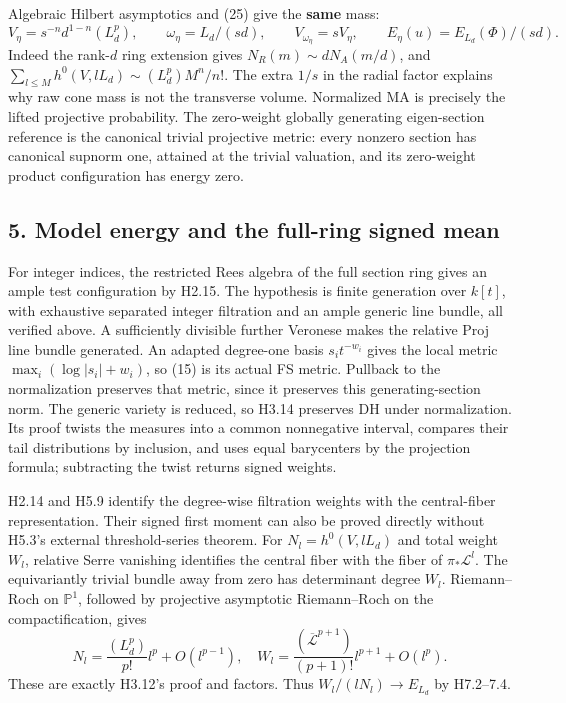 \documentclass[
  10pt,
]{article}
\begin{document}
Algebraic Hilbert asymptotics and (25) give the \textbf{same} mass:
\[ V_\eta=s^{-n}d^{1-n}(L_d^p),\qquad\omega_\eta=L_d/(sd),\qquad V_{\omega_\eta}=sV_\eta,\qquad
 E_\eta(u)=E_{L_d}(\Phi)/(sd).                                                               \tag{26}\]
Indeed the rank-\(d\) ring extension gives \(N_R(m)\sim dN_A(m/d)\), and
\(\sum_{l\leq M}h^0(V,lL_d)\sim(L_d^p)M^n/n!\). The extra \(1/s\) in the
radial factor explains why raw cone mass is not the transverse volume.
Normalized MA is precisely the lifted projective probability. The
zero-weight globally generating eigen-section reference is the canonical
trivial projective metric: every nonzero section has canonical supnorm
one, attained at the trivial valuation, and its zero-weight product
configuration has energy zero.

\subsection{5. Model energy and the full-ring signed
mean}\label{model-energy-and-the-full-ring-signed-mean}

For integer indices, the restricted Rees algebra of the full section
ring gives an ample test configuration by H2.15. The hypothesis is
finite generation over \(k[t]\), with exhaustive separated integer
filtration and an ample generic line bundle, all verified above. A
sufficiently divisible further Veronese makes the relative Proj line
bundle generated. An adapted degree-one basis \(s_i t^{-w_i}\) gives the
local metric \(\max_i(\log|s_i|+w_i)\), so (15) is its actual FS metric.
Pullback to the normalization preserves that metric, since it preserves
this generating-section norm. The generic variety is reduced, so H3.14
preserves DH under normalization. Its proof twists the measures into a
common nonnegative interval, compares their tail distributions by
inclusion, and uses equal barycenters by the projection formula;
subtracting the twist returns signed weights.

H2.14 and H5.9 identify the degree-wise filtration weights with the
central-fiber representation. Their signed first moment can also be
proved directly without H5.3's external threshold-series theorem. For
\(N_l=h^0(V,lL_d)\) and total weight \(W_l\), relative Serre vanishing
identifies the central fiber with the fiber of \(\pi_*\mathcal L^l\).
The equivariantly trivial bundle away from zero has determinant degree
\(W_l\). Riemann--Roch on \(\mathbb P^1\), followed by projective
asymptotic Riemann--Roch on the compactification, gives
\[ N_l=\frac{(L_d^p)}{p!}l^p+O(l^{p-1}),\quad
 W_l=\frac{(\overline{\mathcal L}^{p+1})}{(p+1)!}l^{p+1}+O(l^p).                               \tag{27}\]
These are exactly H3.12's proof and factors. Thus
\(W_l/(lN_l)\to E_{L_d}\) by H7.2--7.4.
\end{document}

